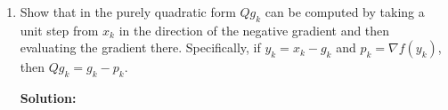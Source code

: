 \documentclass[conference,onecolumn]{IEEEtran}
\begin{document}
\begin{enumerate}
\begin{enumerate}
                        \textbf{Solution:}

                        Gradient and Hessian of $f(x)$:
                        \begin{align*}
                              \begin{cases}
                                    \nabla f(x)            & = Qx + b \\
                                    H_f(x) = \nabla^2 f(x) & = Q
                              \end{cases}
                        \end{align*}
                        And we have:
                        \begin{align*}
                              g_k = \nabla f(x_k) = Qx_k + b
                        \end{align*}
                        Because it's steepest descent in each step, the descent direction $d_k$ at $x_k$ must be the negative gradient $-g_k$, so we have:
                        \begin{align*}
                              d_k = -g_k \Rightarrow d_k^T Q d_k = d_k^T Q (-g_k) = -d_k^T Q g_k
                        \end{align*}
                        Then by the update step of conjugate gradient method we have:
                        \begin{align*}
                              x_{k+1}  & = x_k + \alpha_k d_k                                               \\
                              \alpha_k & = -\frac{g_k^T d_k}{d_k^T Q d_k} = \frac{g_k^T d_k}{d_k^T (Q g_k)}
                        \end{align*}
                        Thus we don't need to use $Q$ explicitly to obtain $x_{k+1}$.
                  \item Show that in the purely quadratic form $Qg_k$ can be computed by taking a unit step from $x_k$ in the direction of the negative gradient and then evaluating the gradient there.
                        Specifically, if $y_k = x_k - g_k$ and $p_k = \nabla f (y_k)$, then $Qg_k = g_k - p_k$.

                        \textbf{Solution:}


\end{enumerate}
\end{enumerate}
\end{document}
